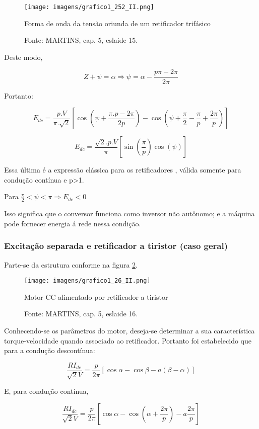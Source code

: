 \begin{figure}[ht!]
\center
\texttt{[image: imagens/grafico1\_252\_II.png]}
\caption{\label{fig:G1-252-II} Forma de onda da tensão oriunda de um retificador trifásico}
\caption*{Fonte: MARTINS, cap. 5, eslaide 15.}
\end{figure}

Deste modo,

\[Z + \psi = \alpha \Rightarrow \psi = \alpha - \frac{p\pi - 2\pi}{2\pi}\]

Portanto:

\[E_{dc} = \frac{p.V}{\pi.\sqrt{2}}\left[\cos\left(\psi + \frac{\pi.p - 2\pi}{2p}\right) - \cos\left(\psi + \frac{\pi}{2} - \frac{\pi}{p} + \frac{2\pi}{p}\right)\right]\]

\[E_{dc} = \frac{\sqrt{2}.p.V}{\pi}\left[\sin\left(\frac{\pi}{p}\right)\cos{(\psi)}\right]\]

Essa última é a expressão clássica para os retificadores , válida somente para condução contínua e p>1.

Para $\frac{\pi}{2} < \psi < \pi  \Rightarrow E_{dc} < 0$

Isso significa que o conversor funciona como inversor não autônomo; e a máquina pode fornecer energia á rede nessa condição. 

\subsubsection{Excitação separada e retificador a tiristor (caso geral)}

Parte-se da estrutura conforme na figura \ref{fig:C1-26-II}.

\begin{figure}[ht!]
\center
\texttt{[image: imagens/grafico1\_26\_II.png]}
\caption{\label{fig:C1-26-II} Motor CC alimentado por retificador a tiristor}
\caption*{Fonte: MARTINS, cap. 5, eslaide 16.}
\end{figure}

Conhecendo-se os parâmetros do motor, deseja-se determinar a sua característica torque-velocidade quando associado ao retificador. Portanto foi estabelecido que para a condução descontínua:

\[\frac{RI_{dc}}{\sqrt{2}V} = \frac{p}{2\pi}\left[\cos\alpha - \cos\beta - a(\beta - \alpha)\right]\]

E, para condução contínua,

\[\frac{RI_{dc}}{\sqrt{2}V} = \frac{p}{2\pi}\left[\cos\alpha - \cos\left(\alpha + \frac{2\pi}{p}\right) - a\frac{2\pi}{p}\right]\]

